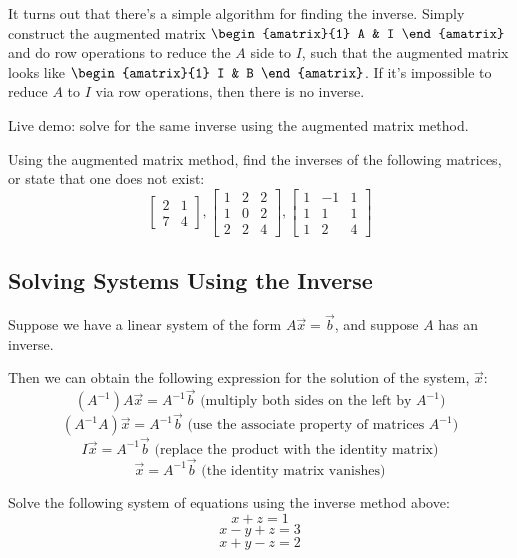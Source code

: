 \documentclass[11pt]{exam}
\begin{document}
    It turns out that there's a simple algorithm for finding the inverse. Simply construct the augmented matrix
    $\begin{amatrix}{1} A & I \end{amatrix}$ and do row operations to reduce the $A$ side to $I$, such that the augmented matrix looks like
    $\begin{amatrix}{1} I & B \end{amatrix}$. If it's impossible to reduce $A$ to $I$ via row operations, then there is no inverse.

    Live demo: solve for the same inverse using the augmented matrix method.

    \begin{questions}
        \item Using the augmented matrix method, find the inverses of the following matrices, or state that one does not exist:
        $$\begin{bmatrix} 2 & 1 \\ 7 & 4 \end{bmatrix},
          \begin{bmatrix} 1 & 2 & 2 \\ 1 & 0 & 2 \\ 2 & 2 & 4 \end{bmatrix},
          \begin{bmatrix} 1 & -1 & 1 \\ 1 & 1 & 1 \\ 1 & 2 & 4 \end{bmatrix}$$
    \end{questions}


    \pagebreak
    \subsection{Solving Systems Using the Inverse}
    Suppose we have a linear system of the form $A\vec{x} = \vec{b}$, and suppose $A$ has an inverse.

    Then we can obtain the following expression for the solution of the system, $\vec{x}$:
    $$(A^{-1})A\vec{x} = A^{-1}\vec{b} \text{ (multiply both sides on the left by }A^{-1})$$
    $$(A^{-1}A)\vec{x} = A^{-1}\vec{b} \text{ (use the associate property of matrices }A^{-1})$$
    $$I\vec{x} = A^{-1}\vec{b} \text{ (replace the product with the identity matrix)}$$
    $$\boxed{\vec{x} = A^{-1} \vec{b}} \text{ (the identity matrix vanishes)}$$

    \begin{questions}
        \item Solve the following system of equations using the inverse method above:
        $$x + z = 1$$
        $$x - y + z = 3$$
        $$x + y - z = 2$$
    \end{questions}
\end{document}
